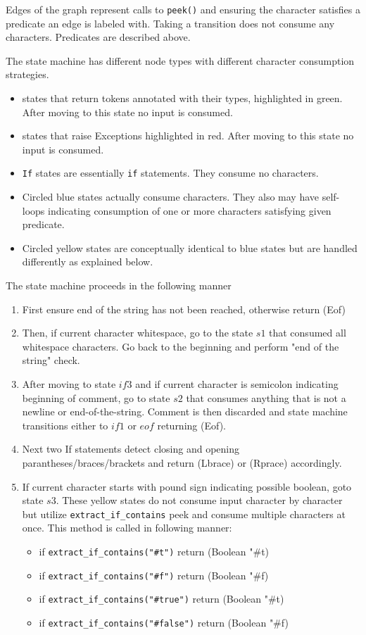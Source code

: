\begin{itemize}
Edges of the graph represent calls to \texttt{peek()} and ensuring the character satisfies a predicate an edge is labeled with. Taking a transition does not consume any characters. Predicates are described above.

The state machine has different node types with different character consumption strategies.
\begin{itemize}
\item states that return tokens annotated with their types, highlighted in green. After moving to this state no input is consumed.
\item states that raise Exceptions highlighted in red. After moving to this state no input is consumed.
\item \texttt{If} states are essentially \texttt{if} statements. They consume no characters.
\item Circled blue states actually consume characters. They also may have self-loops indicating consumption of one or more characters satisfying given predicate.
\item Circled yellow states are conceptually identical to blue states but are handled differently as explained below.
\end{itemize}

The state machine proceeds in the following manner

\begin{enumerate}
\item First ensure end of the string has not been reached, otherwise return (Eof)
\item Then, if current character whitespace, go to the state $s1$ that consumed all whitespace characters. Go back to the beginning and perform "end of the string" check.
\item After moving to state $if3$ and if current character is semicolon indicating beginning of comment, go to state $s2$ that consumes anything that is not a newline or end-of-the-string. Comment is then discarded and state machine transitions either to $if1$ or $eof$ returning (Eof).
\item Next two If statements detect closing and opening parantheses/braces/brackets and return (Lbrace) or (Rprace) accordingly.
\item If current character starts with pound sign indicating possible boolean, goto state $s3$. These yellow states do not consume input character by character but utilize \texttt{extract\_if\_contains} peek and consume multiple characters at once. This method is called in following manner:
\begin{itemize}
\item
if \texttt{extract\_if\_contains("\#t")} return (Boolean "\#t)
\item
if \texttt{extract\_if\_contains("\#f")} return (Boolean "\#f)
\item
if \texttt{extract\_if\_contains("\#true")} return (Boolean "\#t)
\item
if \texttt{extract\_if\_contains("\#false")} return (Boolean "\#f)
\end{itemize}


\end{enumerate}
\end{itemize}
